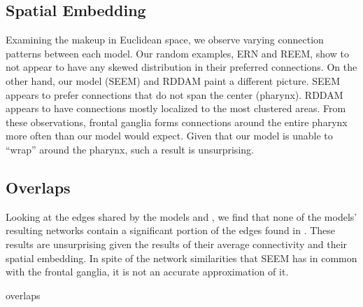 \subsection{Spatial Embedding} %
Examining the makeup in Euclidean space, we observe varying connection patterns between each model. 
Our random examples, ERN and REEM, show to not appear to have any skewed distribution in their preferred connections. 
On the other hand, our model (SEEM) and RDDAM paint a different picture. 
SEEM appears to prefer connections that do not span the center (pharynx). 
RDDAM appears to have connections mostly localized to the most clustered areas.
From these observations, \ce frontal ganglia forms connections around the entire pharynx more often than our model would expect.
Given that our model is unable to ``wrap'' around the pharynx, such a result is unsurprising.

\subsection{Overlaps} %
Looking at the edges shared by the models and \ce, we find that none of the models' resulting networks contain a significant portion of the edges found in \ce. 
These results are unsurprising given the results of their average connectivity and their spatial embedding.
In spite of the network similarities that SEEM has in common with the \ce frontal ganglia, it is not an accurate approximation of it.

{overlaps}